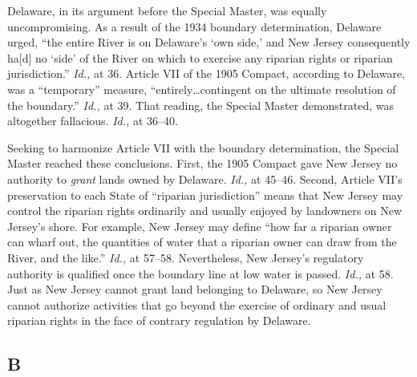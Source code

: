 {{  Delaware, in its argument before the Special Master, was equally
uncompromising. As a result of the 1934 boundary determination, Delaware
urged, ``the entire River is on Delaware's ‘own side,' and
New Jersey consequently ha[d] no ‘side' of the River on which to
exercise any riparian rights or riparian jurisdiction.'' \emph{Id.,}
at 36. Article VII of the 1905 Compact, according to Delaware, was a
``temporary'' measure, ``entirely\dots contingent on the ultimate
resolution of the boundary.'' \emph{Id.,} at 39. That reading, the
Special Master demonstrated, was altogether fallacious. \emph{Id.,} at
36--40.

  Seeking to harmonize Article VII with the boundary determination,
the Special Master reached these conclusions. First, the 1905 Compact
gave New Jersey no authority to \emph{grant} lands owned by Delaware.
\emph{Id.,} at 45--46. Second, Article VII's preservation to each
State of ``riparian jurisdiction'' means that New Jersey may control
the riparian rights ordinarily and usually enjoyed by landowners on
New Jersey's shore. For example, New Jersey may define ``how far a
riparian owner can wharf out, the quantities of water that a riparian
owner can draw from the River, and the like.'' \emph{Id.,} at 57--58.
Nevertheless, New Jersey's regulatory authority is qualified once the
boundary line at low water is passed. \emph{Id.,} at 58. Just as New
Jersey cannot grant land belonging to Delaware, so New Jersey cannot
authorize activities that go beyond the exercise of ordinary and usual
riparian rights in the face of contrary regulation by Delaware.

\subsection{B}

}}
